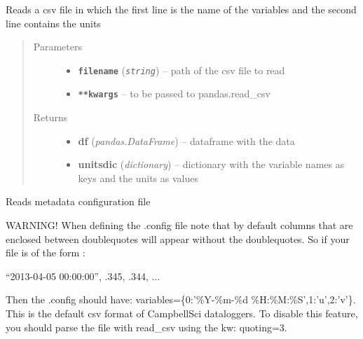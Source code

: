 \documentclass[a4paper,10pt,oneside]{sphinxmanual}
\begin{document}
\begin{fulllineitems}
\label{pymicra:pymicra.io.readUnitsCsv}
Reads a csv file in which the first line is the name of the variables
and the second line contains the units
\begin{quote}\begin{description}
\item[{Parameters}] \leavevmode\begin{itemize}
\item {} 
\textbf{\texttt{filename}} (\emph{\texttt{string}}) -- path of the csv file to read

\item {} 
\textbf{\texttt{**kwargs}} -- to be passed to pandas.read\_csv

\end{itemize}

\item[{Returns}] \leavevmode
\begin{itemize}
\item {} 
\textbf{df} (\emph{pandas.DataFrame}) -- dataframe with the data

\item {} 
\textbf{unitsdic} (\emph{dictionary}) -- dictionary with the variable names as keys and the units as values

\end{itemize}


\end{description}\end{quote}

\end{fulllineitems}


\begin{fulllineitems}
\label{pymicra:pymicra.io.read_fileConfig}
Reads metadata configuration file

WARNING! When defining the .config file note that by default columns that are enclosed between doublequotes
will appear without the doublequotes. So if your file is of the form :

``2013-04-05 00:00:00'', .345, .344, ...

Then the .config should have: variables=\{0:'\%Y-\%m-\%d \%H:\%M:\%S',1:'u',2:'v'\}. This is the default csv format of
CampbellSci dataloggers. To disable this feature, you should parse the file with read\_csv using the kw: quoting=3.

\end{fulllineitems}
\end{document}
